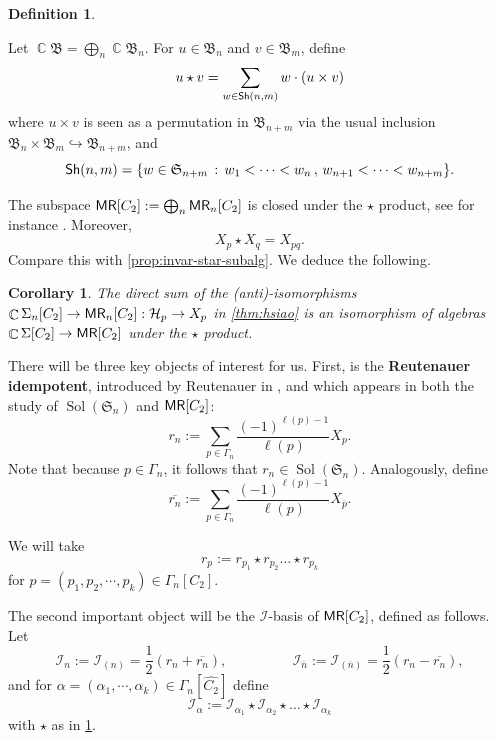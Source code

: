 \documentclass[11pt, oneside, reqno]{amsart}
\newtheorem{cor}[theorem]{Corollary}
\theoremstyle{definition}
\newtheorem{definition}[theorem]{Definition}
\numberwithin{equation}{section}
\DeclareMathOperator{\C}{\mathbb{C}}
\newcommand{\defn}[1]{{\color{RoyalBlue}\bf#1}}
\def \MR {{\sf{MR}}}
\def \kk{\C}
\def \ol{\overline}
\def \sym{\mathfrak{S}}
\def \I {{\mathcal{I}}}
\def \ztwo {{C_2}}
\def \ztwodual {{\widehat{\ztwo}}}
\def \ztwocompositiondual{{\Gamma_n[\ztwodual]}}
\DeclareMathOperator{\sol}{Sol}
\newcommand{\SB}[1]{\mathcal{#1}} 		%
\begin{document}
\begin{definition}\label{def:staronmr}
  
Let $\kk \mathfrak{B} = \bigoplus_n \kk \mathfrak{B}_n$. For $u \in \mathfrak{B}_n$ and $v \in \mathfrak{B}_m$, define
\[
    u \star v = \sum_{w \in {\sf Sh}(n,m)} w \cdot (u \times v)
\]
where $u \times v$ is seen as a permutation in $\mathfrak{B}_{n+m}$ via the usual inclusion $\mathfrak{B}_n \times \mathfrak{B}_m \hookrightarrow \mathfrak{B}_{n+m}$, and
\[
    {\sf Sh}(n,m) = \{ w \in \sym_{n+m} \,:\, w_1 < \dots < w_n \,,\, w_{n+1} < \dots < w_{n+m} \}.
\]  
\end{definition}
The subspace $\MR[\ztwo] := \bigoplus_n \MR_n[\ztwo]$ is closed under the $\star$ product, see for instance \citep[\S 8.2]{abn04peak}.
Moreover,
\begin{equation}\label{eq:starMR-X-basis}
    X_p \star X_q = X_{pq}.
\end{equation}
Compare this with \cref{prop:invar-star-subalg}.
We deduce the following.

\begin{cor}\label{c:isoexternalprod}
    The direct sum of the (anti)-isomorphisms $\kk \Sigma_n[\ztwo] \to \MR_n[\ztwo] : \SB{H}_p \to X_p$ in \cref{thm:hsiao} is an isomorphism of algebras $\kk \Sigma[\ztwo] \to \MR[\ztwo]$ under the $\star$ product.
\end{cor}

There will be three key objects of interest for us. 
First, is the 
 \defn{Reutenauer idempotent}, introduced by Reutenauer in \cite[\S 8.4]{reutenauer2001free}, and which appears in both the study of $\sol(\sym_n)$ and $\MR[\ztwo]$:
\[ r_{n} := \sum_{p \in \Gamma_n}  \frac{(-1)^{\ell(p)-1}}{\ell(p)} X_{p}.\]
Note that because $p \in \Gamma_n$, it follows that $r_{n}\in \sol(\sym_n)$. Analogously, define 
\[ \ol{r_n}:=  \sum_{p \in \Gamma_n}  \frac{(-1)^{\ell(p)-1}}{\ell(p)} X_{\ol{p}}.\]

We will take 
\[ r_{p}:= r_{p_1} \star r_{p_2} \dots \star r_{p_k}\]
for $p = (p_1, p_2, \cdots, p_k) \in \Gamma_n[\ztwo]$. 

The second important object will be the $\I$-basis of $\MR[\ztwo]$, defined as follows. Let 
\[ \I_n:= \I_{(n)}= \frac{1}{2} (r_n + \ol{r_n}), \qquad \text{  } \qquad \I_{\ol{n}}:= \I_{(\ol{n})}= \frac{1}{2}(r_n - \ol{r_n}),\]
and for $\alpha = (\alpha_1, \cdots, \alpha_k) \in  \ztwocompositiondual$ define
\[ \I_\alpha := \I_{\alpha_1} \star \I_{\alpha_2} \star \dots \star \I_{\alpha_k}\]
with $\star$ as in \cref{def:staronmr}.
\end{document}
